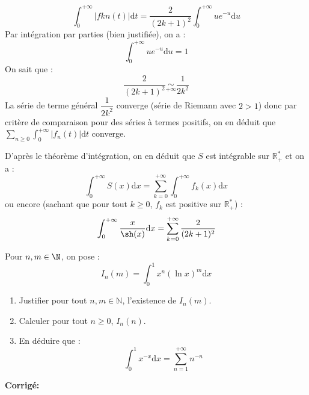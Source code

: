 \documentclass[a4paper,twoside,french,10pt]{VcCours}
\newcommand{\dx}{\text{d}x}
\newcommand{\dt}{\text{d}t}
\newcommand{\corr}{\textbf{Corrigé:}}
\begin{document}
\begin{enumerate}
\begin{itemize}
$$  \int_0^{+ \infty} \vert fkn(t) \vert \dt = \dfrac{2}{(2k+1)^2} \int_0^{+\infty} u e^{-u} \textrm{d}u$$
Par  intégration par parties (bien justifiée), on a :
$$ \int_0^{+\infty} u e^{-u} \textrm{d}u = 1$$
On sait que :
$$ \dfrac{2}{(2k+1)^2} \underset{+ \infty}{\sim} \dfrac{1}{2k^2}$$
La série de terme général $\dfrac{1}{2k^2}$ converge (série de Riemann avec $2>1$) donc par critère de comparaison pour des séries à termes positifs, on en déduit que $\sum_{n \geq 0} \int_{0}^{+ \infty} \vert f_n(t) \vert \dt$ converge.
\end{itemize}
D'après le théorème d'intégration, on en déduit que $S$ est intégrable sur $\mathbb{R}_+^*$ et on a :
$$ \int_0^{+ \infty} S(x) \dx = \sum_{k=0}^{+ \infty} \int_0^{+ \infty} f_k(x) \dx$$
ou encore (sachant que pour tout $k \geq 0$, $f_k$ est positive sur $\mathbb{R}_+^*$) :
$$ \int_0^{+ \infty} \dfrac{x}{\sh(x)} \dx = \sum_{k=0}^{+ \infty} \dfrac{2}{(2k+1)^2}$$
\end{enumerate}


 
\begin{Exercice}{} Pour $n,m \in \N$, on pose :
  \[
  I_{n}(m) = \int_{0}^{1} x^{n}(\ln x)^{m} \dx
  \]
  \begin{enumerate}
  \item Justifier pour tout $n,m \in \mathbb{N}$, l'existence de $I_n(m)$.
  \item Calculer pour tout $n \geq 0$, $I_{n}(n)$.
  \item
    En déduire que :
    \[
    \int_{0}^{1} x^{ - x} \dx = \sum_{n = 1}^{ + \infty} n^{ - n}
    \]
  \end{enumerate}
\end{Exercice}

\corr 
\end{document}
